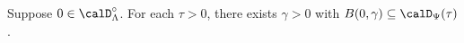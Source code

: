 \begin{corollary}
  \label{corollary:big-time-small-moments}
  Suppose $0 \in \odeSpace^\circ$.
  For each $\tau > 0$, there exists $\gamma > 0$ with $B(0,\gamma) \subseteq \momentSpace(\tau)$.
\end{corollary}
